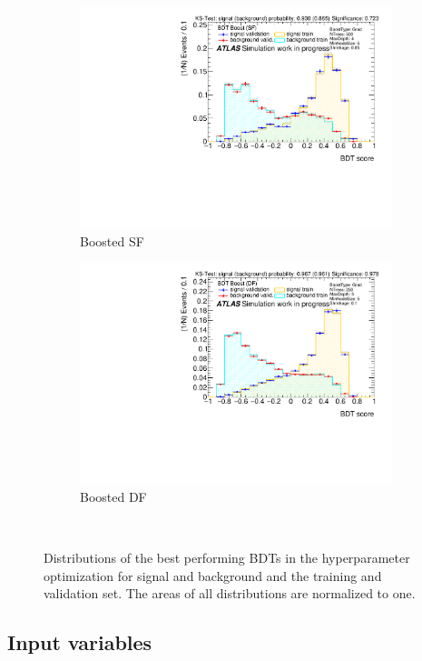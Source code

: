 \begin{figure}[htbp]
\begin{subfigure}[t]{0.49\textwidth}
        \includegraphics[width=\textwidth]{./plots/mva/scan/BOOST_SF_bdt_output.pdf}
        \caption{Boosted SF}
    \end{subfigure}
    \begin{subfigure}[t]{0.49\textwidth}
        \includegraphics[width=\textwidth]{./plots/mva/scan/BOOST_DF_bdt_output.pdf}
        \caption{Boosted DF}
    \end{subfigure}
    \caption{Distributions of the best performing BDTs in the hyperparameter optimization for signal and background and the training and validation set.
             The areas of all distributions are normalized to one.}~\label{fig:mva:scan:bdts}
\end{figure}

\FloatBarrier{}

\subsection{Input variables}\label{sub:mva:input_variables}

